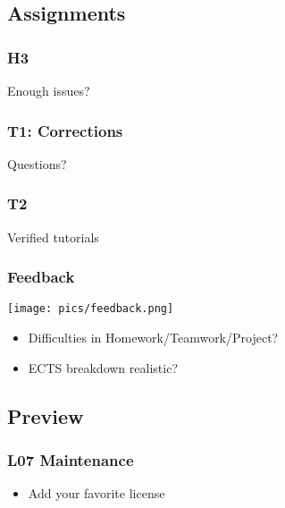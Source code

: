 \subsection{Assignments}

\begin{assignment}
	\frametitle{H3}

	\begin{task}
	Enough issues?
	\end{task}
\end{assignment}

\begin{assignment}
	\frametitle{T1: Corrections}

	\begin{task}
	Questions?
	\end{task}
\end{assignment}

\begin{assignment}
	\frametitle{T2}

	\begin{task}
	Verified tutorials
	\end{task}
\end{assignment}


\begin{frame}
	\frametitle{Feedback}

	\hfill \texttt{[image: pics/feedback.png]}
	\vspace{-1cm}
	\begin{itemize}[<+-| alert@+>]
		\item Difficulties in Homework/Teamwork/Project?
		\item ECTS breakdown realistic?
	\end{itemize}
\end{frame}

\subsection{Preview}

\begin{frame}
	\frametitle{L07 Maintenance}

	\begin{itemize} %
		\item Add your favorite license
	\end{itemize}
\end{frame}


\appendix

\begin{frame}[allowframebreaks]
	
	
\end{frame}



